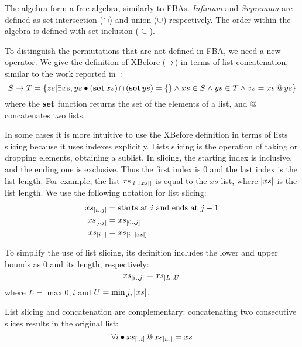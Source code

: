 \documentclass[12pt,openright,twoside,a4paper,oldfontcommands,english,brazil,final]{abntex2}
\makeatletter
\theoremstyle{theo}
\newcommand{\sliceright}[2]{\ensuremath #1_{\left[..#2\right]}}
\newcommand{\sliceleft}[2]{\ensuremath #1_{\left[#2..\right]}}
\newcommand{\slice}[3]{\ensuremath #1_{\left[#2..#3\right]}}
\def\xbeforeop{\ensuremath\rightarrow}
\newcommand{\xbefore}[2]{\ensuremath #1 \xbeforeop #2 }
\newcommand{\length}[1]{\ensuremath\left|#1\right|}
\newcommand{\append}[2]{\ensuremath #1 \operatorname{\mathbf{@}} #2}
\def\listsetop{\ensuremath\operatorname{\mathbf{set}}}
\newcommand{\listset}[1]{\ensuremath\listsetop #1}
\newcommand{\setsin}[1]{\ensuremath\left\{ #1 \right\}}
\newcommand{\parsin}[1]{\ensuremath\left( #1 \right)}
\def\union{\ensuremath\operatorname{\cup}}
\def\inter{\ensuremath\operatorname{\cap}}
\makeatother
\begin{document}
The \ac{algebra} form a free algebra, similarly to \acp{FBA}.
\emph{Infimum} and \emph{Supremum} are defined as set intersection ($\inter$) and union ($\union$) respectively.
The order within the algebra is defined with set inclusion ($\subseteq$).

To distinguish the permutations that are not defined in \ac{FBA}, we need a new operator.
We give the definition of \ac{XBefore} ($\xbeforeop$) in terms of list concatenation, similar to the work reported in~\cite{DM2015}:
%
\begin{equation}
\label{def:xbefore-append}
\xbefore{S}{T} =
  \setsin{
    zs | \exists xs, ys \bullet \parsin{\listset{xs}} \inter \parsin{\listset{ys}} = \{\}
      \land xs \in S \land ys \in T \land zs = \append{xs}{ys}
  }
\end{equation}
%
where the $\listset{}$ function returns the set of the elements of a list, and $\append{}{}$ concatenates two lists.

In some cases it is more intuitive to use the \ac{XBefore} definition in terms of lists slicing because it uses indexes explicitly.
Lists slicing is the operation of taking or dropping elements, obtaining a sublist.
In slicing, the starting index is inclusive, and the ending one is exclusive.
Thus the first index is 0 and the last index is the list length.
For example, the list $\slice{xs}{i}{\length{xs}}$ is equal to the $xs$ list, where $\length{xs}$ is the list length.
We use the following notation for list slicing:
%
\begin{subequations}
\begin{align}
\slice{xs}{i}{j} &= \text{starts at $i$ and ends at $j-1$}\label{def:slice}\\
\sliceright{xs}{j} &= \slice{xs}{0}{j}\label{def:slice-right}\\
\sliceleft{xs}{i} &= \slice{xs}{i}{\length{xs}}\label{def:slice-left}
\end{align}
\end{subequations}

To simplify the use of list slicing, its definition includes the lower and upper bounds as $0$ and its length, respectively:
%
\begin{equation}
\slice{xs}{i}{j} = \slice{xs}{L}{U}
\end{equation}
%
where $L = \max{0,i}$ and $U = \min{j,\length{xs}}$.

List slicing and concatenation are complementary: concatenating two consecutive slices results in the original list:
\begin{equation}
\label{law:slice-append}
\forall i \bullet \append{\sliceright{xs}{i}}{\sliceleft{xs}{i}} = xs
\end{equation}
\end{document}
